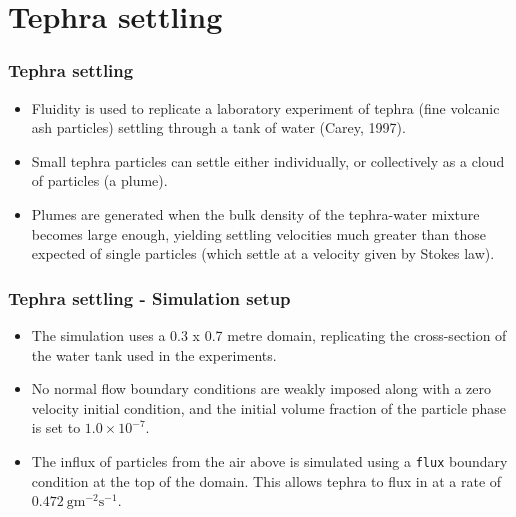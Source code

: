\section{Tephra settling}

\begin{frame}
  \frametitle{Tephra settling}
  \begin{itemize}
    \item Fluidity is used to replicate a laboratory experiment of tephra (fine volcanic ash
particles) settling through a tank of water (Carey, 1997).\newline
    \item Small tephra particles can settle either individually, or collectively as a cloud of particles (a plume).\newline
    \item Plumes are generated when the bulk density of the tephra-water mixture becomes large enough, yielding settling velocities much greater than those expected of single particles (which settle at a velocity given by Stokes law).
  \end{itemize}
\end{frame}

\begin{frame}
  \frametitle{Tephra settling - Simulation setup}
  \begin{itemize}
    \item The simulation uses a 0.3 x 0.7 metre domain, replicating the cross-section of the water tank used in the experiments.\newline
    \item No normal flow boundary conditions are weakly imposed along with a zero velocity initial condition, and the initial volume fraction of the particle phase is set to $1.0 \times 10^{-7}$.\newline
    \item The influx of particles from the air above is simulated using a \texttt{flux} boundary condition at the top of the domain. This allows tephra to flux in at a rate of $0.472\ \mathrm{gm^{-2}s^{-1}}$.
  \end{itemize}
\end{frame}

